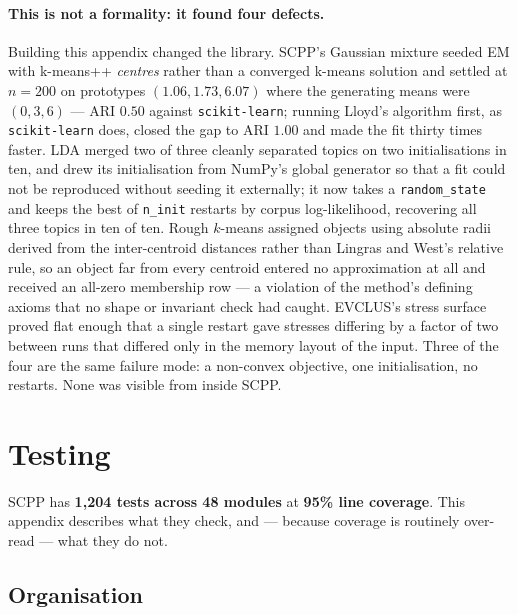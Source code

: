 \documentclass[twoside,11pt]{article}
\begin{document}
\paragraph{This is not a formality: it found four defects.}
Building this appendix changed the library. SCPP's Gaussian mixture seeded EM
with k-means++ \emph{centres} rather than a converged k-means solution and
settled at $n = 200$ on prototypes $(1.06, 1.73, 6.07)$ where the generating
means were $(0, 3, 6)$ --- ARI $0.50$ against \texttt{scikit-learn}; running
Lloyd's algorithm first, as \texttt{scikit-learn} does, closed the gap to ARI
$1.00$ and made the fit thirty times faster. LDA merged two of three cleanly
separated topics on two initialisations in ten, and drew its initialisation
from NumPy's global generator so that a fit could not be reproduced without
seeding it externally; it now takes a \texttt{random\_state} and keeps the
best of \texttt{n\_init} restarts by corpus log-likelihood, recovering all
three topics in ten of ten. Rough $k$-means assigned objects using absolute
radii derived from the inter-centroid distances rather than Lingras and
West's relative rule, so an object far from every centroid entered no
approximation at all and received an all-zero membership row --- a violation
of the method's defining axioms that no shape or invariant check had caught.
EVCLUS's stress surface proved flat enough that a single restart gave
stresses differing by a factor of two between runs that differed only in the
memory layout of the input. Three of the four are the same failure mode:
a non-convex objective, one initialisation, no restarts. None was visible
from inside SCPP.

\section{Testing}\label{Testing}

SCPP has \textbf{1{,}204 tests across 48 modules} at \textbf{95\% line
coverage}. This appendix describes what they check, and --- because coverage
is routinely over-read --- what they do not.

\subsection{Organisation}
\end{document}
